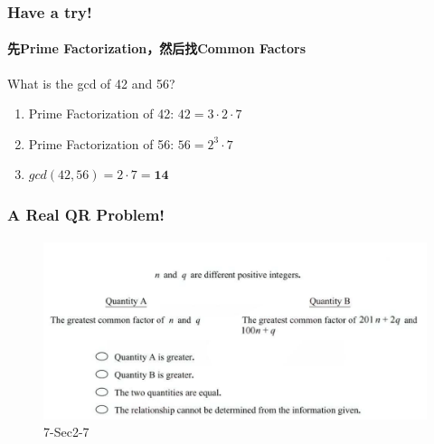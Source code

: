\documentclass[
	11pt, %
]{beamer}
\begin{document}

\begin{frame}
	\frametitle{Have a try!}
	\framesubtitle{先Prime Factorization，然后找Common Factors}
		What is the gcd of 42 and 56?
		 \pause
		 \begin{enumerate}
		 	\item Prime Factorization of 42: $42=3 \cdot 2 \cdot 7$ \pause
		 	\item Prime Factorization of 56: $56=2^3 \cdot 7$ \pause
		 	\item  $gcd(42, 56) = 2 \cdot 7 = \textbf{14}$ 
		 	\end{enumerate}
\end{frame}



\begin{frame}
	\frametitle{A Real QR Problem!}
	\framesubtitle{}
	\begin{figure}
		\includegraphics[width=\linewidth]{GCD_Example_Question.png}
		\caption{7-Sec2-7}
	\end{figure}
\bigskip

\end{frame}

\end{document}

